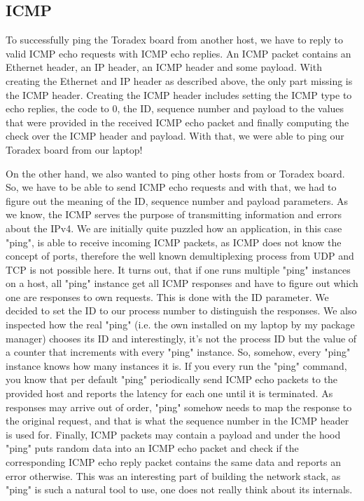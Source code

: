 \subsection{ICMP}

To successfully ping the Toradex board from another host, we have to reply to valid ICMP echo requests with ICMP echo replies. An ICMP packet contains an Ethernet header, an IP header, an ICMP header and some payload. With creating the Ethernet and IP header as described above, the only part missing is the ICMP header. Creating the ICMP header includes setting the ICMP type to echo replies, the code to 0, the ID, sequence number and payload to the values that were provided in the received ICMP echo packet and finally computing the check over the ICMP header and payload. With that, we were able to ping our Toradex board from our laptop!

On the other hand, we also wanted to ping other hosts from or Toradex board. So, we have to be able to send ICMP echo requests and with that, we had to figure out the meaning of the ID, sequence number and payload parameters.
As we know, the ICMP serves the purpose of transmitting information and errors about the IPv4. We are initially quite puzzled how an application, in this case "ping", is able to receive incoming ICMP packets, as ICMP does not know the concept of ports, therefore the well known demultiplexing process from UDP and TCP is not possible here.
It turns out, that if one runs multiple "ping" instances on a host, all "ping" instance get all ICMP responses and have to figure out which one are responses to own requests. This is done with the ID parameter. We decided to set the ID to our process number to distinguish the responses. We also inspected how the real "ping" (i.e. the own installed on my laptop by my package manager) chooses its ID and interestingly, it's not the process ID but the value of a counter that increments with every "ping" instance. So, somehow, every "ping" instance knows how many instances it is.
If you every run the "ping" command, you know that per default "ping" periodically send ICMP echo packets to the provided host and reports the latency for each one until it is terminated. As responses may arrive out of order, "ping" somehow needs to map the response to the original request, and that is what the sequence number in the ICMP header is used for.
Finally, ICMP packets may contain a payload and under the hood "ping" puts random data into an ICMP echo packet and check if the corresponding ICMP echo reply packet contains the same data and reports an error otherwise.
This was an interesting part of building the network stack, as "ping" is such a natural tool to use, one does not really think about its internals.


